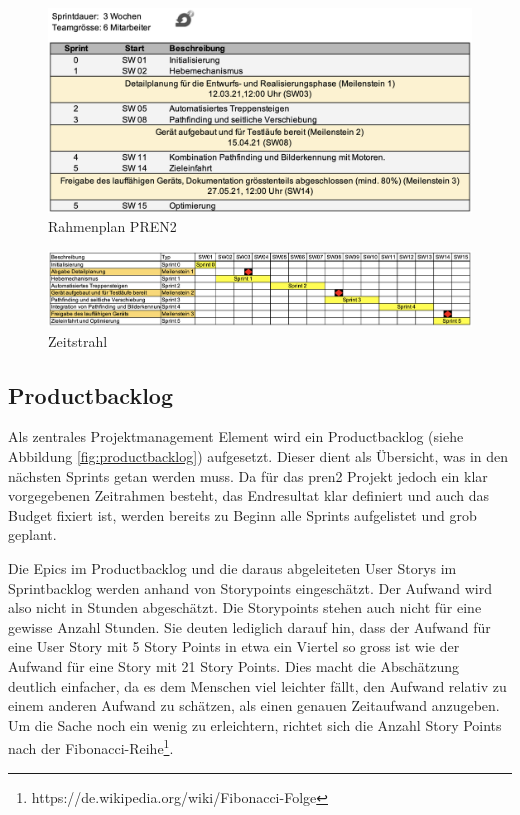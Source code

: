 \begin{figure}[H]
  \includegraphics[width=1.0\textwidth]{img/projektmanagement/Rahmenplan PREN2.png}
  \centering
  \caption{Rahmenplan PREN2}
  \label{fig:rahmenplan}
\end{figure}

\begin{figure}[H]
  \includegraphics[width=1.0\textwidth]{img/projektmanagement/Zeitstrahl.png}
  \centering
  \caption{Zeitstrahl}
  \label{fig:zeitstrahl}
\end{figure}

\newpage

\subsection{Productbacklog}
Als zentrales Projektmanagement Element wird ein Productbacklog (siehe Abbildung \ref{fig:productbacklog}) aufgesetzt. Dieser dient als Übersicht, was in den nächsten Sprints getan werden muss. Da für das \acrshort{pren2} Projekt jedoch ein klar vorgegebenen Zeitrahmen besteht, das Endresultat klar definiert und auch das Budget fixiert ist, werden bereits zu Beginn alle Sprints aufgelistet und grob geplant. 

Die Epics im Productbacklog und die daraus abgeleiteten User Storys im Sprintbacklog werden anhand von Storypoints eingeschätzt. Der Aufwand wird also nicht in Stunden abgeschätzt. Die Storypoints stehen auch nicht für eine gewisse Anzahl Stunden. Sie deuten lediglich darauf hin, dass der Aufwand für eine User Story mit 5 Story Points in etwa ein Viertel so gross ist wie der Aufwand für eine Story mit 21 Story Points. Dies macht die Abschätzung deutlich einfacher, da es dem Menschen viel leichter fällt, den Aufwand relativ zu einem anderen Aufwand zu schätzen, als einen genauen Zeitaufwand anzugeben. Um die Sache noch ein wenig zu erleichtern, richtet sich die Anzahl Story Points nach der Fibonacci-Reihe\footnote{https://de.wikipedia.org/wiki/Fibonacci-Folge}.

